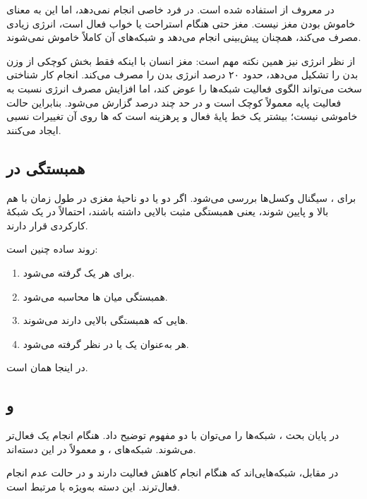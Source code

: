 در  معروف  از  استفاده شده است. در  فرد  خاصی انجام نمی‌دهد، اما این به معنای خاموش بودن مغز نیست. مغز حتی هنگام استراحت یا خواب فعال است، انرژی زیادی مصرف می‌کند، همچنان پیش‌بینی انجام می‌دهد و شبکه‌های آن کاملاً خاموش نمی‌شوند.

از نظر انرژی نیز همین نکته مهم است: مغز انسان با اینکه فقط بخش کوچکی از وزن بدن را تشکیل می‌دهد، حدود ۲۰ درصد انرژی بدن را مصرف می‌کند. انجام کار شناختی سخت می‌تواند الگوی فعالیت شبکه‌ها را عوض کند، اما افزایش مصرف انرژی نسبت به فعالیت پایه معمولاً کوچک است و در حد چند درصد گزارش می‌شود. بنابراین  حالت خاموشی نیست؛ بیشتر یک خط پایهٔ فعال و پرهزینه است که ها روی آن تغییرات نسبی ایجاد می‌کنند.

\subsection{همبستگی در }
برای ،  سیگنال  وکسل‌ها بررسی می‌شود. اگر دو  یا دو ناحیهٔ مغزی در طول زمان با هم بالا و پایین شوند، یعنی همبستگی مثبت بالایی داشته باشند، احتمالاً در یک شبکهٔ کارکردی قرار دارند.

روند ساده چنین است:

\begin{enumerate}
  \item برای هر  یک  گرفته می‌شود.
  \item همبستگی میان ها محاسبه می‌شود.
  \item {}هایی که همبستگی بالایی دارند  می‌شوند.
  \item هر  به‌عنوان یک  یا  در نظر گرفته می‌شود.
\end{enumerate}

در اینجا  همان  است.

\subsection{ و }
در پایان بحث ، شبکه‌ها را می‌توان با دو مفهوم توضیح داد.  هنگام انجام یک  فعال‌تر می‌شوند. شبکه‌های ،  و  معمولاً در این دسته‌اند.

در مقابل،  شبکه‌هایی‌اند که هنگام انجام  کاهش فعالیت دارند و در حالت عدم انجام  فعال‌ترند. این دسته به‌ویژه با  مرتبط است.

